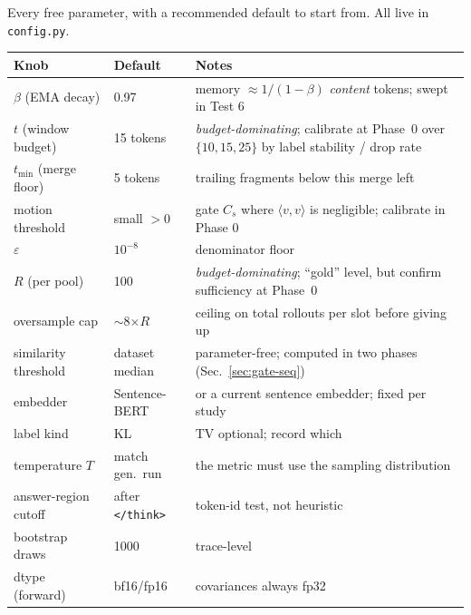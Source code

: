 \documentclass[11pt]{article}
\newcommand{\modu}[1]{\texttt{#1}}
\begin{document}
Every free parameter, with a recommended default to start from. All live in \modu{config.py}.
\begin{center}
\begin{tabular}{@{}l l p{}@{}}
\toprule
\textbf{Knob} & \textbf{Default} & \textbf{Notes} \\
\midrule
$\beta$ (EMA decay)        & 0.97          & memory $\approx 1/(1-\beta)$ \emph{content} tokens; swept in Test 6 \\
$t$ (window budget)        & 15 tokens     & \emph{budget-dominating}; calibrate at Phase~0 over $\{10,15,25\}$ by label stability / drop rate \\
$t_{\min}$ (merge floor)   & 5 tokens      & trailing fragments below this merge left \\
motion threshold           & small $>0$    & gate $C_s$ where $\langle v,v\rangle$ is negligible; calibrate in Phase 0 \\
$\varepsilon$              & $10^{-8}$     & denominator floor \\
$R$ (per pool)             & 100           & \emph{budget-dominating}; ``gold'' level, but confirm sufficiency at Phase~0 \\
oversample cap             & $\sim$8$\times R$ & ceiling on total rollouts per slot before giving up \\
similarity threshold       & dataset median& parameter-free; computed in two phases (Sec.~\ref{sec:gate-seq}) \\
embedder                   & Sentence-BERT & or a current sentence embedder; fixed per study \\
label kind                 & KL            & TV optional; record which \\
temperature $T$            & match gen.\ run& the metric must use the sampling distribution \\
answer-region cutoff       & after \texttt{</think>} & token-id test, not heuristic \\
bootstrap draws            & 1000          & trace-level \\
dtype (forward)            & bf16/fp16     & covariances always fp32 \\
\bottomrule
\end{tabular}
\end{center}
\end{document}
